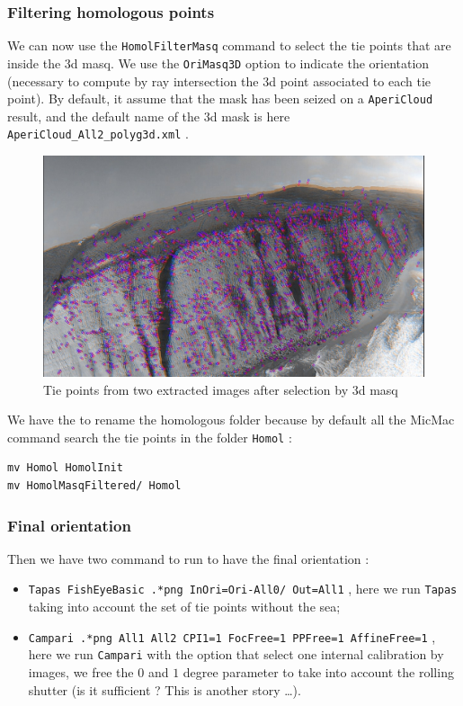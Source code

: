 \subsubsection{Filtering homologous points}

We can now use the  {\tt HomolFilterMasq} command to select the tie points that are inside the $3$d masq.
We use the {\tt OriMasq3D} option to indicate the orientation (necessary to compute by ray intersection the $3$d point
associated to each tie point). By default, it assume that the mask has been seized on a {\tt AperiCloud} result, and
the default name of the $3$d mask is  here {\tt AperiCloud\_All2\_polyg3d.xml} .


\begin{figure}
\centering
\includegraphics[width=0.90\linewidth]{FIGS/GoProVideo/SIFT2.jpg}
\caption{Tie points from  two extracted images after selection by $3$d masq}
\label{fig:GoProSIFT2}
\end{figure}

We have the to rename the homologous folder because by default all the MicMac command search the tie points 
in the folder {\tt Homol} :

\begin{verbatim}
mv Homol HomolInit
mv HomolMasqFiltered/ Homol
\end{verbatim}

\subsubsection{Final orientation}

Then we have two command to run to have the final orientation :


\begin{itemize}
   \item {\tt Tapas   FishEyeBasic .*png InOri=Ori-All0/ Out=All1} , here we run {\tt Tapas} taking into account
         the set of tie points without the sea;

   \item {\tt Campari  .*png  All1 All2 CPI1=1 FocFree=1 PPFree=1 AffineFree=1} , here we run {\tt Campari} with the option
         that select one internal calibration by images, we free the $0$ and $1$ degree parameter to take into account the
          rolling shutter (is it sufficient ? This is another story \dots).
\end{itemize}

